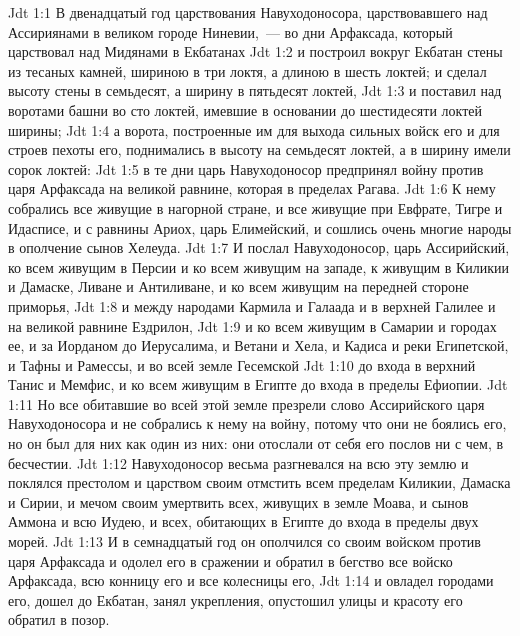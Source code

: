 \vs Jdt 1:1 В двенадцатый год царствования Навуходоносора, царствовавшего над Ассириянами в великом городе Ниневии,~--- во дни Арфаксада, который царствовал над Мидянами в Екбатанах
\vs Jdt 1:2 и построил вокруг Екбатан стены из тесаных камней, шириною в три локтя, а длиною в шесть локтей; и сделал высоту стены в семьдесят, а ширину в пятьдесят локтей,
\vs Jdt 1:3 и поставил над воротами башни во сто локтей, имевшие в основании до шестидесяти локтей ширины;
\vs Jdt 1:4 а ворота, построенные им для выхода сильных войск его и для строев пехоты его, поднимались в высоту на семьдесят локтей, а в ширину имели сорок локтей:
\vs Jdt 1:5 в те дни царь Навуходоносор предпринял войну против царя Арфаксада на великой равнине, которая в пределах Рагава.
\vs Jdt 1:6 К нему собрались все живущие в нагорной стране, и все живущие при Евфрате, Тигре и Идасписе, и с равнины Ариох, царь Елимейский, и сошлись очень многие народы в ополчение сынов Хелеуда.
\vs Jdt 1:7 И послал Навуходоносор, царь Ассирийский, ко всем живущим в Персии и ко всем живущим на западе, к живущим в Киликии и Дамаске, Ливане и Антиливане, и ко всем живущим на передней стороне приморья,
\vs Jdt 1:8 и между народами Кармила и Галаада и в верхней Галилее и на великой равнине Ездрилон,
\vs Jdt 1:9 и ко всем живущим в Самарии и городах ее, и за Иорданом до Иерусалима, и Ветани и Хела, и Кадиса и реки Египетской, и Тафны и Рамессы, и во всей земле Гесемской
\vs Jdt 1:10 до входа в верхний Танис и Мемфис, и ко всем живущим в Египте до входа в пределы Ефиопии.
\vs Jdt 1:11 Но все обитавшие во всей этой земле презрели слово Ассирийского царя Навуходоносора и не собрались к нему на войну, потому что они не боялись его, но он был для них как один из них: они отослали от себя его послов ни с чем, в бесчестии.
\vs Jdt 1:12 Навуходоносор весьма разгневался на всю эту землю и поклялся престолом и царством своим отмстить всем пределам Киликии, Дамаска и Сирии, и мечом своим умертвить всех, живущих в земле Моава, и сынов Аммона и всю Иудею, и всех, обитающих в Египте до входа в пределы двух морей.
\rsbpar\vs Jdt 1:13 И в семнадцатый год он ополчился со своим войском против царя Арфаксада и одолел его в сражении и обратил в бегство все войско Арфаксада, всю конницу его и все колесницы его,
\vs Jdt 1:14 и овладел городами его, дошел до Екбатан, занял укрепления, опустошил улицы  и красоту его обратил в позор.
